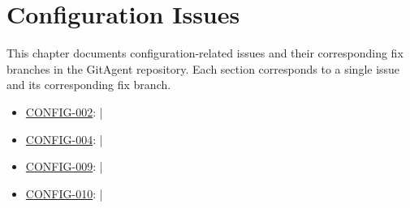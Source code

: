 \chapter{Configuration Issues}
\label{chap:config}

This chapter documents configuration-related issues and their corresponding fix branches in the GitAgent repository. Each section corresponds to a single issue and its corresponding fix branch.

\begin{itemize}
    \item \hyperref[sec:config-002]{CONFIG-002}:  | 
    \item \hyperref[sec:config-004]{CONFIG-004}:  | 
    \item \hyperref[sec:config-009]{CONFIG-009}:  | 
    \item \hyperref[sec:config-010]{CONFIG-010}:  | 
\end{itemize}








